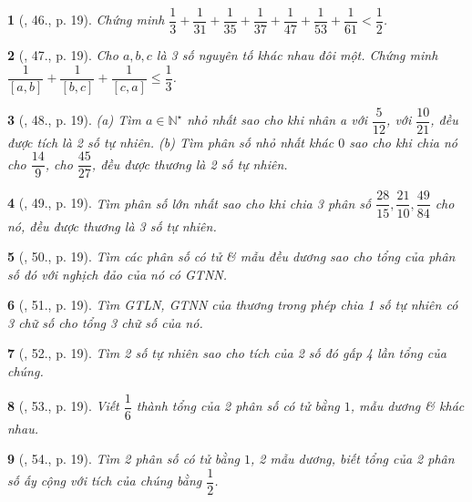 \documentclass{article}
\newtheorem{baitoan}{}
\begin{document}
\begin{baitoan}[\cite{Binh_Toan_6_tap_2}, 46., p. 19]
	Chứng minh $\dfrac{1}{3} + \dfrac{1}{31} + \dfrac{1}{35} + \dfrac{1}{37} + \dfrac{1}{47} + \dfrac{1}{53} + \dfrac{1}{61} < \dfrac{1}{2}$.
\end{baitoan}

\begin{baitoan}[\cite{Binh_Toan_6_tap_2}, 47., p. 19]
	Cho $a,b,c$ là 3 số nguyên tố khác nhau đôi một. Chứng minh $\dfrac{1}{[a,b]} + \dfrac{1}{[b,c]} + \dfrac{1}{[c,a]}\le\dfrac{1}{3}$.
\end{baitoan}

\begin{baitoan}[\cite{Binh_Toan_6_tap_2}, 48., p. 19]
	(a) Tìm $a\in\mathbb{N}^\star$ nhỏ nhất sao cho khi nhân a với $\dfrac{5}{12}$, với $\dfrac{10}{21}$, đều được tích là 2 số tự nhiên. (b) Tìm phân số nhỏ nhất khác $0$ sao cho khi chia nó cho $\dfrac{14}{9}$, cho $\dfrac{45}{27}$, đều được thương là 2 số tự nhiên.
\end{baitoan}

\begin{baitoan}[\cite{Binh_Toan_6_tap_2}, 49., p. 19]
	Tìm phân số lớn nhất sao cho khi chia 3 phân số $\dfrac{28}{15},\dfrac{21}{10},\dfrac{49}{84}$ cho nó, đều được thương là 3 số tự nhiên.
\end{baitoan}

\begin{baitoan}[\cite{Binh_Toan_6_tap_2}, 50., p. 19]
	Tìm các phân số có tử \& mẫu đều dương sao cho tổng của phân số đó với nghịch đảo của nó có {\rm GTNN}.
\end{baitoan}

\begin{baitoan}[\cite{Binh_Toan_6_tap_2}, 51., p. 19]
	Tìm {\rm GTLN, GTNN} của thương trong phép chia 1 số tự nhiên có 3 chữ số cho tổng 3 chữ số của nó.
\end{baitoan}

\begin{baitoan}[\cite{Binh_Toan_6_tap_2}, 52., p. 19]
	Tìm 2 số tự nhiên sao cho tích của 2 số đó gấp 4 lần tổng của chúng.
\end{baitoan}

\begin{baitoan}[\cite{Binh_Toan_6_tap_2}, 53., p. 19]
	Viết $\dfrac{1}{6}$ thành tổng của 2 phân số có tử bằng $1$, mẫu dương \& khác nhau.
\end{baitoan}

\begin{baitoan}[\cite{Binh_Toan_6_tap_2}, 54., p. 19]
	Tìm 2 phân số có tử bằng $1$, 2 mẫu dương, biết tổng của 2 phân số ấy cộng với tích của chúng bằng $\dfrac{1}{2}$.
\end{baitoan}
\end{document}
